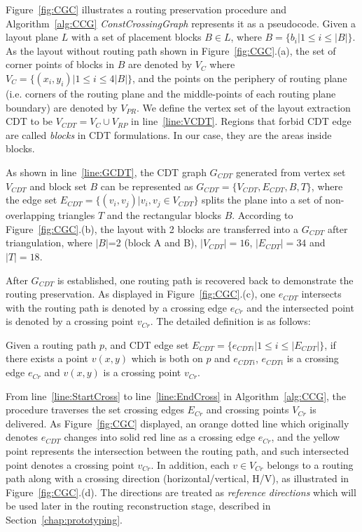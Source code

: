     Figure~\ref{fig:CGC} illustrates a routing preservation procedure and Algorithm~\ref{alg:CCG} {\it ConstCrossingGraph} represents it as a pseudocode. Given a layout plane $L$ with a set of placement blocks $B \in L$, where $B = \{b_i|1 \leq i \leq |B|\}$. As the layout without routing path shown in Figure~\ref{fig:CGC}.(a), the set of corner points of blocks in $B$ are denoted by $V_C$ where $V_C = \{(x_i,y_i)|1 \leq i \leq 4|B|\}$, and the points on the periphery of routing plane (i.e. corners of the routing plane and the middle-points of each routing plane boundary) are denoted by $V_{PR}$. We define the vertex set of the layout extraction CDT to be $V_{CDT} = V_C \cup V_{RP}$ in line~\ref{line:VCDT}. Regions that forbid CDT edge are called {\it blocks} in CDT formulations. In our case, they are the areas inside blocks.


    As shown in line~\ref{line:GCDT}, the CDT graph $G_{CDT}$ generated from vertex set $V_{CDT}$ and block set $B$ can be represented as $G_{CDT} = \{V_{CDT},E_{CDT},B,T\}$, where the edge set $E_{CDT} = \{(v_i,v_j)|v_i,v_j\in V_{CDT}\}$ splits the plane into a set of non-overlapping triangles $T$ and the rectangular blocks $B$. According to Figure~\ref{fig:CGC}.(b), the layout with 2 blocks are transferred into a $G_{CDT}$ after triangulation, where $|B|$=2 (block A and B), $|V_{CDT}|=16$, $|E_{CDT}|=34$ and $|T|=18$.


    After $G_{CDT}$ is established, one routing path is recovered back to demonstrate the routing preservation. As displayed in Figure~\ref{fig:CGC}.(c), one $e_{CDT}$ intersects with the routing path is denoted by a crossing edge $e_{Cr}$ and the intersected point is denoted by a crossing point $v_{Cr}$. The detailed definition is as follows:

     
    \begin{defi}\label{defi:CrossingPoint}
      Given a routing path $p$, and CDT edge set $E_{CDT}= \{e_{CDTi}| 1 \leq i\leq|E_{CDT}|\}$, if there exists a point $v(x,y)$ which is both on $p$ and $e_{CDTi}$, $e_{CDTi}$ is a crossing edge $e_{Cr}$ and $v(x,y)$ is a crossing point $v_{Cr}$.
    \end{defi}

    From line~\ref{line:StartCross} to line~\ref{line:EndCross} in Algorithm~\ref{alg:CCG}, the procedure traverses the set crossing edges $E_{Cr}$ and crossing points $V_{Cr}$ is delivered. As Figure~\ref{fig:CGC} displayed, an orange dotted line which originally denotes $e_{CDT}$ changes into solid red line as a crossing edge $e_{Cr}$, and the yellow point represents the intersection between the routing path, and such intersected point denotes a crossing point $v_{Cr}$. In addition, each $v \in V_{Cr}$ belongs to a routing path along with a crossing direction (horizontal/vertical, H/V), as illustrated in Figure~\ref{fig:CGC}.(d). The directions are treated as {\it reference directions} which will be used later in the routing reconstruction stage, described in Section~\ref{chap:prototyping}. 



